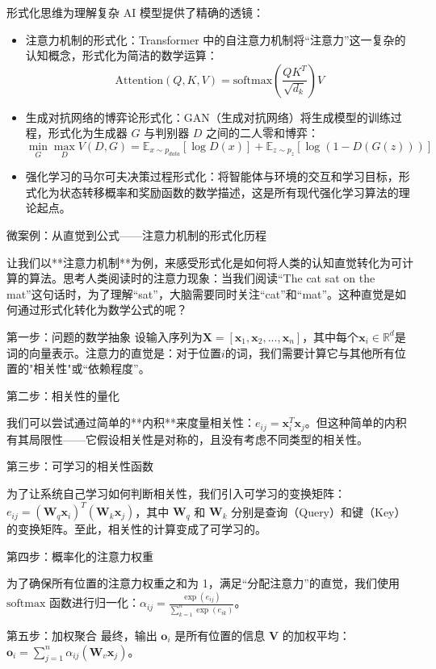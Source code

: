 形式化思维为理解复杂 AI 模型提供了精确的透镜：

\begin{itemize}
\item 注意力机制的形式化：Transformer 中的自注意力机制将“注意力”这一复杂的认知概念，形式化为简洁的数学运算：$$\text{Attention}(Q,K,V) = \text{softmax}(\frac{QK^T}{\sqrt{d_k}})V$$
\item 生成对抗网络的博弈论形式化：GAN（生成对抗网络）将生成模型的训练过程，形式化为生成器 $G$ 与判别器 $D$ 之间的二人零和博弈：$$\min_G \max_D V(D,G) = \mathbb{E}_{x \sim p_{data}}[\log D(x)] + \mathbb{E}_{z \sim p_z}[\log(1-D(G(z)))]$$
\item 强化学习的马尔可夫决策过程形式化：将智能体与环境的交互和学习目标，形式化为状态转移概率和奖励函数的数学描述，这是所有现代强化学习算法的理论起点。
\end{itemize}

微案例：从直觉到公式——注意力机制的形式化历程

让我们以**注意力机制**为例，来感受形式化是如何将人类的认知直觉转化为可计算的算法。思考人类阅读时的注意力现象：当我们阅读“The cat sat on the mat”这句话时，为了理解“sat”，大脑需要同时关注“cat”和“mat”。这种直觉是如何通过形式化转化为数学公式的呢？

第一步：问题的数学抽象
设输入序列为$\mathbf{X} = [\mathbf{x}_1, \mathbf{x}_2, ..., \mathbf{x}_n]$，其中每个$\mathbf{x}_i \in \mathbb{R}^d$是词的向量表示。注意力的直觉是：对于位置$i$的词，我们需要计算它与其他所有位置的"相关性"或“依赖程度”。

第二步：相关性的量化

我们可以尝试通过简单的**内积**来度量相关性：$e_{ij} = \mathbf{x}_i^T \mathbf{x}_j$。但这种简单的内积有其局限性——它假设相关性是对称的，且没有考虑不同类型的相关性。

第三步：可学习的相关性函数

为了让系统自己学习如何判断相关性，我们引入可学习的变换矩阵：$e_{ij} = (\mathbf{W}_q \mathbf{x}_i)^T (\mathbf{W}_k \mathbf{x}_j)$，其中 $\mathbf{W}_q$ 和 $\mathbf{W}_k$ 分别是查询（Query）和键（Key）的变换矩阵。至此，相关性的计算变成了可学习的。

第四步：概率化的注意力权重

为了确保所有位置的注意力权重之和为 1，满足“分配注意力”的直觉，我们使用 $\text{softmax}$ 函数进行归一化：$\alpha_{ij} = \frac{\exp(e_{ij})}{\sum_{k=1}^{n} \exp(e_{ik})}$。

第五步：加权聚合
最终，输出 $\mathbf{o}_i$ 是所有位置的信息 $\mathbf{V}$ 的加权平均：$\mathbf{o}_i = \sum_{j=1}^{n} \alpha_{ij} (\mathbf{W}_v \mathbf{x}_j)$。

